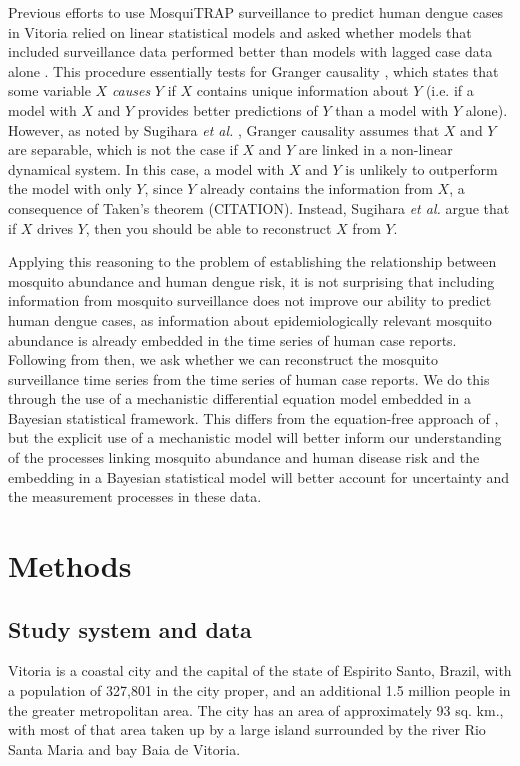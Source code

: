 \documentclass[10pt,letterpaper]{article}
\begin{document}
Previous efforts to use MosquiTRAP surveillance to predict human dengue cases in Vitoria relied on linear statistical models and asked whether models that included surveillance data performed better than models with lagged case data alone \cite{Pepin2015}.
This procedure essentially tests for Granger causality \cite{Granger1969}, which states that some variable $X$ \emph{causes} $Y$ if $X$ contains unique information about $Y$ (i.e. if a model with $X$ and $Y$ provides better predictions of $Y$ than a model with $Y$ alone).
However, as noted by Sugihara \emph{et al.} \cite{Sugihara2012a}, Granger causality assumes that $X$ and $Y$ are separable, which is not the case if $X$ and $Y$ are linked in a non-linear dynamical system.
In this case, a model with $X$ and $Y$ is unlikely to outperform the model with only $Y$, since $Y$ already contains the information from $X$, a consequence of Taken's theorem (CITATION). 
Instead, Sugihara \emph{et al.} argue that if $X$ drives $Y$, then you should be able to reconstruct $X$ from $Y$.

Applying this reasoning to the problem of establishing the relationship between mosquito abundance and human dengue risk, it is not surprising that including information from mosquito surveillance does not improve our ability to predict human dengue cases, as information about epidemiologically relevant mosquito abundance is already embedded in the time series of human case reports.
Following from \cite{Sugihara2012a} then, we ask whether we can reconstruct the mosquito surveillance time series from the time series of human case reports. 
We do this through the use of a mechanistic differential equation model embedded in a Bayesian statistical framework.
This differs from the equation-free approach of \cite{Sugihara2012a}, but the explicit use of a mechanistic model will better inform our understanding of the processes linking mosquito abundance and human disease risk and the embedding in a Bayesian statistical model will better account for uncertainty and the measurement processes in these data.

\section*{Methods}

\subsection*{Study system and data}

Vitoria is a coastal city and the capital of the state of Espirito Santo, Brazil, with a population of 327,801 in the city proper, and an additional 1.5 million people in the greater metropolitan area.  
The city has an area of approximately 93 sq. km., with most of that area taken up by a large island surrounded by the river Rio Santa Maria and bay Baia de Vitoria.  
\end{document}
